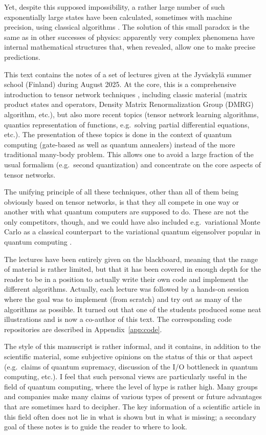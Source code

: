 \documentclass{SciPost}
\begin{document}
Yet, despite this supposed impossibility, a rather large number of such exponentially large states have been calculated, sometimes with machine precision, using classical algorithms
\cite{white1992,pan2019}.
The solution of this small paradox is the same as in other successes of physics: apparently very complex phenomena have internal mathematical structures that, when revealed, allow one to make precise predictions.

This text contains the notes of a set of lectures given at the
Jyväskylä summer school (Finland) during August 2025.
At the core, this is a comprehensive introduction to tensor network techniques
\cite{schollwoeck2011,orus2014,bridgeman2017,cirac2021}, including classic material (matrix product states and operators, Density Matrix Renormalization Group (DMRG) algorithm, etc.), but also more recent topics (tensor network learning algorithms, quantics representation of functions, e.g.\ solving partial differential equations, etc.). The presentation of these topics is done in the context of quantum computing (gate-based as well as quantum annealers) instead of the more traditional many-body problem. This allows one to avoid a large fraction of the usual formalism (e.g.\ second quantization) and concentrate on the core aspects of tensor networks.

The unifying principle of all these techniques, other than all of them being obviously based on tensor networks, is that they all compete in one way or another with what quantum computers are supposed to do. These are not the only competitors, though, and we could have also included e.g.\ variational Monte Carlo \cite{becca2017} as a classical counterpart to the variational quantum eigensolver popular in quantum computing \cite{louvet2024}.

The lectures have been entirely given on the blackboard, meaning that the range of material is rather limited, but that it has been covered in enough depth for the reader to be in a position to actually write their own code and implement the different algorithms. Actually, each lecture was followed by a hands-on session where the goal was to implement (from scratch) and try out as many of the algorithms as possible. It turned out that one of the students produced some neat illustrations and is now a co-author of this text. The corresponding code repositories are described in Appendix~\ref{app:code}.

The style of this manuscript is rather informal, and it contains, in addition to the scientific material, some subjective opinions on the status of this or that aspect (e.g.\ claims of quantum supremacy, discussion of the I/O bottleneck in quantum computing, etc.). I feel that such personal views are particularly useful in the field of quantum computing, where the level of hype is rather high. Many groups and companies make many claims of various types of present or future advantages that are sometimes hard to decipher. The key information of a scientific article in this field often does not lie in what is shown but in what is missing; a secondary goal of these notes is to guide the reader to where to look.
\end{document}
